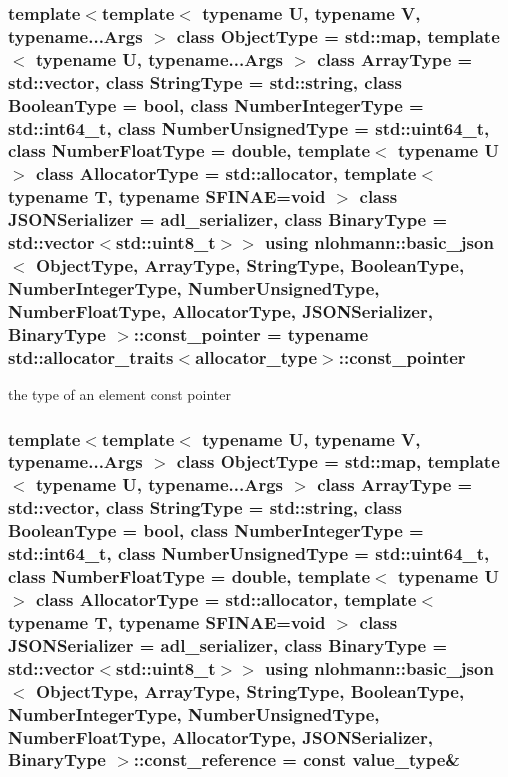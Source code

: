 \subsubsection[{\texorpdfstring{const\+\_\+pointer}{const_pointer}}]{\setlength{\rightskip}{0pt plus 5cm}template$<$template$<$ typename U, typename V, typename...\+Args $>$ class Object\+Type = std\+::map, template$<$ typename U, typename...\+Args $>$ class Array\+Type = std\+::vector, class String\+Type  = std\+::string, class Boolean\+Type  = bool, class Number\+Integer\+Type  = std\+::int64\+\_\+t, class Number\+Unsigned\+Type  = std\+::uint64\+\_\+t, class Number\+Float\+Type  = double, template$<$ typename U $>$ class Allocator\+Type = std\+::allocator, template$<$ typename T, typename S\+F\+I\+N\+A\+E=void $>$ class J\+S\+O\+N\+Serializer = adl\+\_\+serializer, class Binary\+Type  = std\+::vector$<$std\+::uint8\+\_\+t$>$$>$ using {\bf nlohmann\+::basic\+\_\+json}$<$ Object\+Type, Array\+Type, String\+Type, Boolean\+Type, Number\+Integer\+Type, Number\+Unsigned\+Type, Number\+Float\+Type, Allocator\+Type, J\+S\+O\+N\+Serializer, Binary\+Type $>$\+::{\bf const\+\_\+pointer} =  typename std\+::allocator\+\_\+traits$<${\bf allocator\+\_\+type}$>$\+::{\bf const\+\_\+pointer}}\hypertarget{classnlohmann_1_1basic__json_a4108c5148f1d7cf13c2681e22f141a10}{}\label{classnlohmann_1_1basic__json_a4108c5148f1d7cf13c2681e22f141a10}


the type of an element const pointer 

\subsubsection[{\texorpdfstring{const\+\_\+reference}{const_reference}}]{\setlength{\rightskip}{0pt plus 5cm}template$<$template$<$ typename U, typename V, typename...\+Args $>$ class Object\+Type = std\+::map, template$<$ typename U, typename...\+Args $>$ class Array\+Type = std\+::vector, class String\+Type  = std\+::string, class Boolean\+Type  = bool, class Number\+Integer\+Type  = std\+::int64\+\_\+t, class Number\+Unsigned\+Type  = std\+::uint64\+\_\+t, class Number\+Float\+Type  = double, template$<$ typename U $>$ class Allocator\+Type = std\+::allocator, template$<$ typename T, typename S\+F\+I\+N\+A\+E=void $>$ class J\+S\+O\+N\+Serializer = adl\+\_\+serializer, class Binary\+Type  = std\+::vector$<$std\+::uint8\+\_\+t$>$$>$ using {\bf nlohmann\+::basic\+\_\+json}$<$ Object\+Type, Array\+Type, String\+Type, Boolean\+Type, Number\+Integer\+Type, Number\+Unsigned\+Type, Number\+Float\+Type, Allocator\+Type, J\+S\+O\+N\+Serializer, Binary\+Type $>$\+::{\bf const\+\_\+reference} =  const {\bf value\+\_\+type}\&}\hypertarget{classnlohmann_1_1basic__json_ab8a1c33ee7b154fc41ca2545aa9724e6}{}\label{classnlohmann_1_1basic__json_ab8a1c33ee7b154fc41ca2545aa9724e6}


